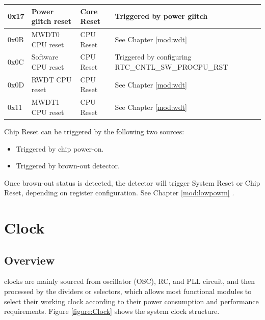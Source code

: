 \documentclass[main\_\_EN.tex]{subfiles}
\begin{document}
\begin{table}[H]
\begin{threeparttable}
\begin{tabular}{ | l | m{3.7cm} | m{2.1cm} | m{8.9cm} | }
        0x17 & Power glitch reset & Core Reset & Triggered by power glitch
        \\\hline
        0x0B & MWDT0 CPU reset & CPU Reset & See Chapter  \ref{mod:wdt} \textit{\nameref{mod:wdt}}
        \\\hline
         0x0C & Software CPU reset  & CPU Reset  & Triggered by configuring  RTC\_CNTL\_SW\_PROCPU\_RST \\
        \hline
        0x0D & RWDT CPU reset & CPU Reset & See Chapter  \ref{mod:wdt} \textit{\nameref{mod:wdt}}
        \\\hline
        0x11 & MWDT1 CPU reset & CPU Reset & See Chapter  \ref{mod:wdt} \textit{\nameref{mod:wdt}}
        \\\hline
        \end{tabular}

        \begin{tablenotes}
            \item[1]  Chip Reset can be triggered by the following two sources:
    \begin{itemize}
        \item Triggered by chip power-on.
        \item Triggered by brown-out detector.
    \end{itemize}
  \item[2] Once brown-out status is detected, the detector will trigger System Reset or Chip Reset, depending on register configuration. See Chapter  \ref{mod:lowpowm} \textit{}.
        \end{tablenotes}
     \end{threeparttable}
    \end{table}

\section{Clock}

\subsection{Overview}

\chipname{} clocks are mainly sourced from oscillator (OSC), RC, and PLL circuit, and then processed by the dividers or selectors, which allows most functional modules to select their working clock according to their power consumption and performance requirements. Figure  \ref{figure:Clock} shows the system clock structure.
\end{document}
